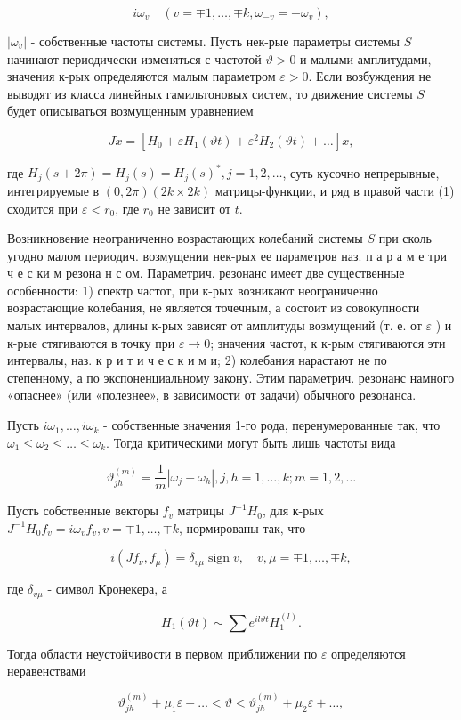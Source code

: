 \documentclass[10pt]{article}
\begin{document}
\[
i \omega_{v} \quad\left(v=\mp 1, \ldots, \mp k, \omega_{-v}=-\omega_{v}\right),
\]

$\left|\omega_{v}\right|$ - собственные частоты системы. Пусть нек-рые параметры системы $S$ начинают периодически изменяться с частотой $\vartheta>0$ и малыми амплитудами, значения к-рых определяются малым параметром $\varepsilon>0$. Если возбуждения не выводят из класса линейных гамильтоновых систем, то движение системы $S$ будет описываться возмущенным уравнением

\[
J \dot{x}=\left[H_{0}+\varepsilon H_{1}(\mathfrak{\vartheta} t)+\varepsilon^{2} H_{2}(\mathfrak{\vartheta} t)+\ldots\right] x,
\]

где $H_{j}(s+2 \pi)=H_{j}(s)=H_{j}(s)^{*}, j=1,2, \ldots$, суть кусочно непрерывные, интегрируемые в $(0,2 \pi)(2 k \times 2 k)$ матрицы-функции, и ряд в правой части (1) сходится при $\varepsilon<r_{0}$, где $r_{0}$ не зависит от $t$.

Возникновение неограниченно возрастающих колебаний системы $S$ при сколь угодно малом периодич. возмущении нек-рых ее параметров наз. п а р а м е три ч е с ки м резона н с ом. Параметрич. резонанс имеет две существенные особенности: 1) спектр частот, при к-рых возникают неограниченно возрастающие колебания, не является точечным, а состоит из совокупности малых интервалов, длины к-рых зависят от амплитуды возмущений (т. е. от $\varepsilon$ ) и к-рые стягиваются в точку при $\varepsilon \rightarrow 0$; значения частот, к к-рым стягиваются эти интервалы, наз. к р и т и ч е с к и м и; 2) колебания нарастают не по степенному, а по экспоненциальному закону. Этим параметрич. резонанс намного «опаснее» (или «полезнее», в зависимости от задачи) обычного резонанса.

Пусть $i \omega_{1}, \ldots, i \omega_{k}$ - собственные значения 1-го рода, перенумерованные так, что $\omega_{1} \leqslant \omega_{2} \leqslant \ldots \leqslant \omega_{k}$. Тогда критическими могут быть лишь частоты вида

\[
\vartheta_{j h}^{(m)}=\frac{1}{m}\left|\omega_{j}+\omega_{h}\right|, j, h=1, \ldots, k ; m=1,2, \ldots
\]

Пусть собственные векторы $f_{v}$ матрицы $J^{-1} H_{0}$, для к-рых $J^{-1} H_{0} f_{v}=i \omega_{v} f_{v}, v=\mp 1, \ldots, \mp k$, нормированы так, что

\[
i\left(J f_{\nu}, f_{\mu}\right)=\delta_{v \mu} \operatorname{sign} v, \quad v, \mu=\mp 1, \ldots, \mp k,
\]

где $\delta_{v \mu}$ - символ Кронекера, а

\[
H_{1}(\vartheta t) \sim \sum e^{i l \vartheta t} H_{1}^{(l)} .
\]

Тогда области неустойчивости в первом приближении по $\varepsilon$ определяются неравенствами

\[
\mathfrak{\vartheta}_{j h}^{(m)}+\mu_{1} \varepsilon+\ldots<\vartheta<\vartheta_{j h}^{(m)}+\mu_{2} \varepsilon+\ldots,
\]
\end{document}
